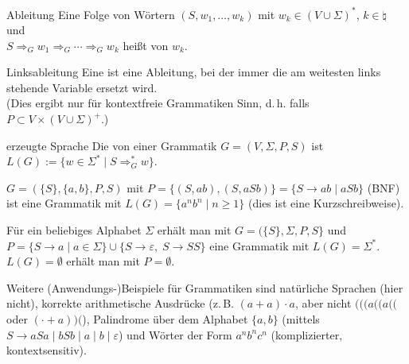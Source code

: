 \begin{Def}{Ableitung}
    Eine Folge von Wörtern $(S, w_1, \dotsc, w_k)$ mit
    $w_k \in (V \cup \Sigma)^\ast$, $k \in \natural$ und\\
    $S \Rightarrow_G w_1 \Rightarrow_G \dotsb \Rightarrow_G w_k$
    heißt  von $w_k$.
\end{Def}

\begin{Def}{Linksableitung}
    Eine  ist eine Ableitung, bei der immer die am
    weitesten links stehende Variable ersetzt wird.\\
    (Dies ergibt nur für kontextfreie Grammatiken Sinn, d.\,h. falls
    $P \subset V \times (V \cup \Sigma)^+$.)
\end{Def}

\begin{Def}{erzeugte Sprache}
    Die von einer Grammatik $G = (V, \Sigma, P, S)$ 
    ist\\
    $L(G) := \{w \in \Sigma^\ast \;|\; S \Rightarrow_G^\ast w\}$.
\end{Def}

\linie
\pagebreak

\begin{Bsp}
    $G = (\{S\}, \{a, b\}, P, S)$ mit $P = \{(S, ab), (S, aSb)\} =
    \{S \rightarrow ab \;|\; aSb\}$ (BNF) ist eine Grammatik mit
    $L(G) = \{a^n b^n \;|\; n \ge 1\}$
    (dies ist eine Kurzschreibweise).
\end{Bsp}

\begin{Bsp}
    Für ein beliebiges Alphabet $\Sigma$ erhält man mit
    $G = (\{S\}, \Sigma, P, S\}$ und\\
    $P = \{S \rightarrow a \;|\; a \in \Sigma\} \cup
    \{S \rightarrow \varepsilon,\; S \rightarrow SS\}$ eine Grammatik
    mit $L(G) = \Sigma^\ast$.\\
    $L(G) = \emptyset$ erhält man mit $P = \emptyset$.
\end{Bsp}

\begin{Bsp}
    Weitere (Anwendungs-)Beispiele für Grammatiken sind natürliche Sprachen
    (hier nicht),
    korrekte arithmetische Ausdrücke
    (z.\,B. $(a + a) \cdot a$, aber nicht $(((a((a(($ oder $(\cdot + a))($),
    Palindrome über dem Alphabet $\{a, b\}$
    (mittels $S \rightarrow aSa \;|\; bSb \;|\; a \;|\; b \;|\; \varepsilon$)
    und Wörter der Form $a^n b^n c^n$ (komplizierter, kontextsensitiv).
\end{Bsp}

